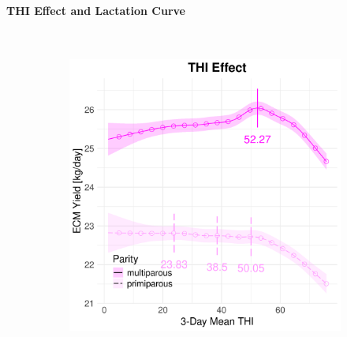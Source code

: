 \paragraph{THI Effect and Lactation Curve} \quad \\
\begin{figure}[H]
    \centering
    \begin{subfigure}[b]{0.45\textwidth}
        \centering
        \includegraphics[width=\textwidth]{thesis/figures/models/ecm/before2010/sf_ecm_before2010/sf_ecm_before2010_marginal_thi_milk_combined.png}
    \end{subfigure}
    \hspace{0.05\textwidth} %
    \begin{subfigure}[b]{0.45\textwidth}
        \centering

\end{subfigure}
\end{figure}
